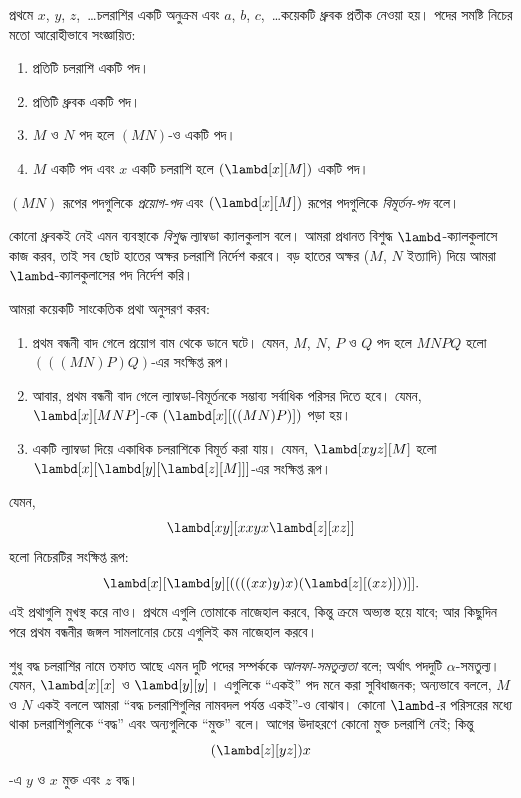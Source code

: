 \documentclass[../../../include/open-logic-section]{subfiles}
\begin{document}

প্রথমে $x$, $y$, $z$,~\dots চলরাশির একটি অনুক্রম এবং $a$, $b$,
$c$,~\dots কয়েকটি ধ্রুবক প্রতীক নেওয়া হয়। পদের সমষ্টি নিচের মতো
আরোহীভাবে সংজ্ঞায়িত:
\begin{enumerate}
\item প্রতিটি চলরাশি একটি পদ।
\item প্রতিটি ধ্রুবক একটি পদ।
\item $M$ ও $N$ পদ হলে $(MN)$-ও একটি পদ।
\item $M$ একটি পদ এবং $x$ একটি চলরাশি হলে $(\lambd[x][M])$ একটি পদ।
\end{enumerate}
$(MN)$ রূপের পদগুলিকে \emph{প্রয়োগ-পদ} এবং $(\lambd[x][M])$ রূপের
পদগুলিকে \emph{বিমূর্তন-পদ} বলে।

কোনো ধ্রুবকই নেই এমন ব্যবস্থাকে \emph{বিশুদ্ধ} ল্যাম্বডা ক্যালকুলাস
বলে। আমরা প্রধানত বিশুদ্ধ $\lambd$-ক্যালকুলাসে কাজ করব, তাই সব ছোট হাতের
অক্ষর চলরাশি নির্দেশ করবে। বড় হাতের অক্ষর ($M$, $N$ ইত্যাদি) দিয়ে আমরা
$\lambd$-ক্যালকুলাসের পদ নির্দেশ করি।

আমরা কয়েকটি সাংকেতিক প্রথা অনুসরণ করব:

\begin{conv}
\begin{enumerate}
\item প্রথম বন্ধনী বাদ গেলে প্রয়োগ বাম থেকে ডানে ঘটে। যেমন, $M$, $N$,
  $P$ ও $Q$ পদ হলে $MNPQ$ হলো $(((MN)P)Q)$-এর সংক্ষিপ্ত রূপ।
\item আবার, প্রথম বন্ধনী বাদ গেলে ল্যাম্বডা-বিমূর্তনকে সম্ভাব্য সর্বাধিক
  পরিসর দিতে হবে। যেমন, $\lambd[x][MNP]$-কে
  $(\lambd[x][((MN)P)])$ পড়া হয়।
\item একটি ল্যাম্বডা দিয়ে একাধিক চলরাশিকে বিমূর্ত করা যায়। যেমন,
  $\lambd[xyz][M]$ হলো
  $\lambd[x][\lambd[y][\lambd[z][M]]]$-এর সংক্ষিপ্ত রূপ।
\end{enumerate}
\end{conv}

যেমন,
\[
\lambd[xy][xxyx \lambd[z][xz]]
\]
হলো নিচেরটির সংক্ষিপ্ত রূপ:
\[
\lambd[x][\lambd[y][((((xx)y)x)(\lambd[z][(xz)]))]].
\]
এই প্রথাগুলি মুখস্থ করে নাও। প্রথমে এগুলি তোমাকে
নাজেহাল করবে, কিন্তু ক্রমে অভ্যস্ত হয়ে যাবে; আর কিছুদিন পরে প্রথম বন্ধনীর
জঙ্গল সামলানোর চেয়ে এগুলিই কম নাজেহাল করবে।

শুধু বদ্ধ চলরাশির নামে তফাত আছে এমন দুটি পদের সম্পর্ককে
\emph{আলফা-সমতুল্যতা} বলে; অর্থাৎ পদদুটি $\alpha$-সমতুল্য। যেমন,
$\lambd[x][x]$ ও $\lambd[y][y]$। এগুলিকে ``একই'' পদ মনে করা সুবিধাজনক;
অন্যভাবে বললে, $M$ ও $N$ একই বললে আমরা ``বদ্ধ চলরাশিগুলির নামবদল পর্যন্ত
একই''-ও বোঝাব। কোনো $\lambd$-র পরিসরের মধ্যে থাকা চলরাশিগুলিকে ``বদ্ধ''
এবং অন্যগুলিকে ``মুক্ত'' বলে। আগের উদাহরণে কোনো মুক্ত চলরাশি নেই; কিন্তু
\[
(\lambd[z][yz])x
\]
-এ $y$ ও $x$ মুক্ত এবং $z$ বদ্ধ।
\end{document}
